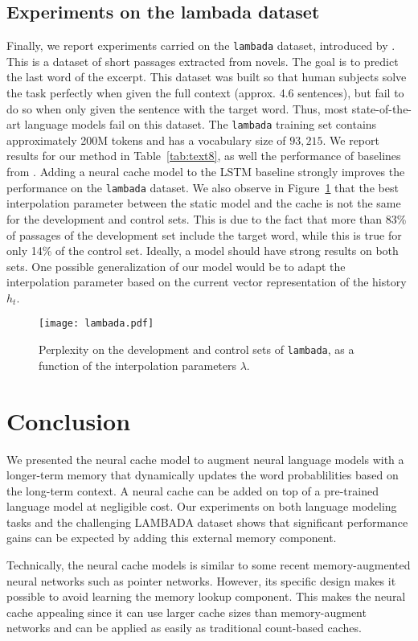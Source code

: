 \documentclass{article} \usepackage{iclr2017_conference,times}
\begin{document}
\subsection{Experiments on the lambada dataset}
Finally, we report experiments carried on the \texttt{lambada} dataset, introduced by \citet{paperno2016lambada}.
This is a dataset of short passages extracted from novels.
The goal is to predict the last word of the excerpt.
This dataset was built so that human subjects solve the task perfectly when given the full context (approx. 4.6 sentences), but fail to do so when only given the sentence with the target word.
Thus, most state-of-the-art language models fail on this dataset.
The \texttt{lambada} training set contains approximately 200M tokens and has a vocabulary size of $93,215$.
We report results for our method in Table~\ref{tab:text8}, as well the performance of baselines from \citet{paperno2016lambada}.
Adding a neural cache model to the LSTM baseline strongly improves the performance on the \texttt{lambada} dataset.
We also observe in Figure~\ref{fig:lambada} that the best interpolation parameter between the static model and the cache is not the same for the development and control sets.
This is due to the fact that more than 83\% of passages of the development set include the target word, while this is true for only 14\% of the control set.
Ideally, a model should have strong results on both sets.
One possible generalization of our model would be to adapt the interpolation parameter based on the current vector representation of the history $h_t$.

\begin{figure}
  \centering
  \texttt{[image: lambada.pdf]}

  \vspace{-0.3cm}
  \caption{Perplexity on the development and control sets of \texttt{lambada}, as a function of the interpolation parameters $\lambda$.}
  \label{fig:lambada}
\end{figure}
 
\section{Conclusion}

We presented the neural cache model to augment neural language models
with a longer-term memory that dynamically updates the word
probablilities based on the long-term context. A neural cache can be
added on top of a pre-trained language model at negligible cost. Our
experiments on both language modeling tasks and the challenging
LAMBADA dataset shows that significant performance gains can be
expected by adding this external memory component.

Technically, the neural cache models is similar to some recent
memory-augmented neural networks such as pointer networks. However,
its specific design makes it possible to avoid learning the memory
lookup component. This makes the neural cache appealing since
it can use larger cache sizes than memory-augment networks and can be
applied as easily as traditional count-based caches.
 
\small


\end{document}
